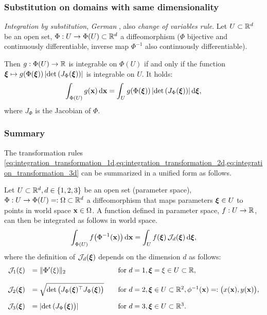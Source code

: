 \subsubsection{Substitution on domains with same dimensionality}
\emph{Integration by substitution}, \textit{German }, also \emph{change of variables rule}.
Let $U \subset \mathbb{R}^d$ be an open set, $\Phi:U \to \Phi(U) \subset\mathbb{R}^d$ a diffeomorphism ($\Phi$ bijective and continuously differentiable, inverse map $\Phi^{-1}$ also continuously differentiable).

Then $g:\Phi(U) \to \mathbb{R}$ is integrable on $\Phi(U)$ if and only if the function $\boldsymbol{\xi} \mapsto g(\Phi(\boldsymbol{\xi}))\,|\hbox{det} \,(J_{\Phi}(\boldsymbol{\xi}))|$ is integrable on $U$. It holds:
\begin{equation}\label{eq:integration_transformation_3d}
  \begin{array}{ll}
    \ds\int_{\Phi(U)} g(\bfx)\,\d \bfx = \ds\int_U g(\Phi(\bfxi))\,|\det(J_{\Phi}(\bfxi))|\,\d \bfxi,
  \end{array}
\end{equation}
where $J_{\Phi}$ is the Jacobian of $\Phi$.

\subsubsection{Summary}
The transformation rules \cref{eq:integration_transformation_1d,eq:integration_transformation_2d,eq:integration_transformation_3d} can be summarized in a unified form as follows.

Let $U \subset \mathbb{R}^d, d\in\{1,2,3\}$ be an open set (parameter space), $\Phi:U \to \Phi(U)=:\Omega \subset\mathbb{R}^d$ a diffeomorphism that maps parameters $\boldsymbol{\xi} \in U$ to points in world space $\textbf{x} \in \Omega$. A function defined in parameter space, $f:U\to \mathbb{R}$, can then be integrated as follows in world space.
%
\begin{equation}\label{eq:integration_transformation_dd}
  \begin{array}{lll}
    \ds\int_{\Phi(U)} f\big(\Phi^{-1}(\bfx)\big)\,\d \bfx = \ds\int_U f(\bfxi)\,\mathcal{J}_d(\bfxi)\,\d \bfxi,
  \end{array}
\end{equation}
where the definition of $\mathcal{J}_d(\boldsymbol{\xi})$  depends on the dimension $d$ as follows:
%
\begin{equation*}
  \begin{array}{rll}
    \mathcal{J}_1(\xi) &= \Vert \Phi'(\xi) \Vert_2 &\quad \text{for }d=1, \boldsymbol{\xi}=\xi \in U \subset \mathbb{R},\\[4mm]
    \mathcal{J}_2(\boldsymbol{\xi}) &= \sqrt{\hbox{det} \, \big(J_{\Phi}(\boldsymbol{\xi})^\top J_{\Phi}(\boldsymbol{\xi})\big)} &\quad \text{for }d=2, \boldsymbol{\xi}\in U \subset \mathbb{R}^2, \phi^{-1}(\textbf{x}) =: \big(x(\textbf{x}), y(\textbf{x})\big),\\[4mm]
    \mathcal{J}_3(\boldsymbol{\xi}) &= |\hbox{det} \, (J_{\Phi}\big(\boldsymbol{\xi})\big)| &\quad \text{for }d=3, \boldsymbol{\xi}\in U \subset \mathbb{R}^3.
  \end{array}
\end{equation*}

\newpage
{}


%


